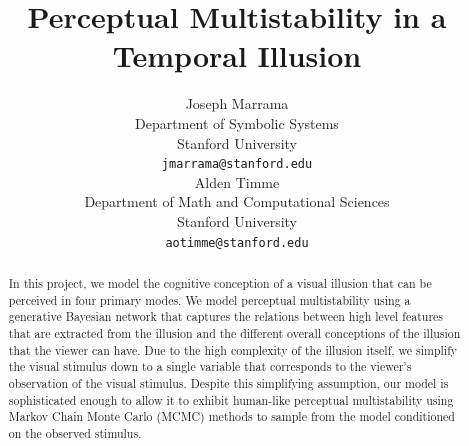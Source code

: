 \documentclass{article} %
\title{Perceptual Multistability in a Temporal Illusion}
\author{
Joseph Marrama \\
Department of Symbolic Systems\\
Stanford University\\
\texttt{jmarrama@stanford.edu} \\
\And
Alden Timme \\
Department of Math and Computational Sciences \\
Stanford University \\
\texttt{aotimme@stanford.edu} \\
}
\begin{document}
\maketitle

\begin{abstract}
In this project, we model the cognitive conception of a visual illusion that can be perceived in four primary modes. 
We model perceptual multistability using a generative Bayesian network that captures the relations between high level features that are extracted from the illusion and the different overall conceptions of the illusion that the viewer can have.
Due to the high complexity of the illusion itself, we simplify the visual stimulus down to a single variable that corresponds to the viewer's observation of the visual stimulus.
Despite this simplifying assumption, our model is sophisticated enough to allow it to exhibit human-like perceptual multistability using Markov Chain Monte Carlo (MCMC) methods to sample from the model conditioned on the observed stimulus.


\end{abstract}




\end{document}
